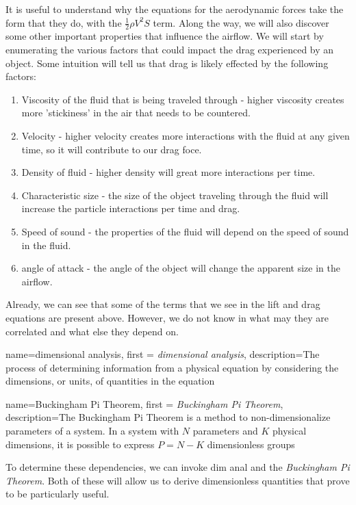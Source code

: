 \documentclass[12pt]{report}
\begin{document}
{It is useful to understand why the equations for the aerodynamic forces take the form that they do, with the $\frac{1}{2}\rho V^2S$ term. Along the way, we will also discover some other important properties that influence the airflow. We will start by enumerating the various factors that could impact the drag experienced by an object. Some intuition will tell us that drag is likely effected by the following factors:
\begin{enumerate}
    \item Viscosity of the fluid that is being traveled through - higher viscosity creates more 'stickiness' in the air that needs to be countered.
    \item Velocity - higher velocity creates more interactions with the fluid at any given time, so it will contribute to our drag foce.
    \item Density of fluid - higher density will great more interactions per time.
    \item Characteristic size - the size of the object traveling through the fluid will increase the particle interactions per time and drag.
    \item Speed of sound - the properties of the fluid will depend on the speed of sound in the fluid.
    \item \gls{angle of attack} - the angle of the object will change the apparent size in the airflow.
\end{enumerate}
Already, we can see that some of the terms that we see in the lift and drag equations are present above. However, we do not know in what may they are correlated and what else they depend on.

{
    name=dimensional analysis,
    first = {\textit{dimensional analysis}},
    description={The process of determining information from a physical equation by considering the dimensions, or units, of quantities in the equation}
}

{
    name=Buckingham Pi Theorem,
    first = {\textit{Buckingham Pi Theorem}},
    description={The Buckingham Pi Theorem is a method to non-dimensionalize parameters of a system. In a system with $N$ parameters and $K$ physical dimensions, it is possible to express $P=N-K$ dimensionless groups}
}

To determine these dependencies, we can invoke \gls{dim anal} and the \textit{Buckingham Pi Theorem}. Both of these will allow us to derive dimensionless quantities that prove to be particularly useful.

}
\end{document}
